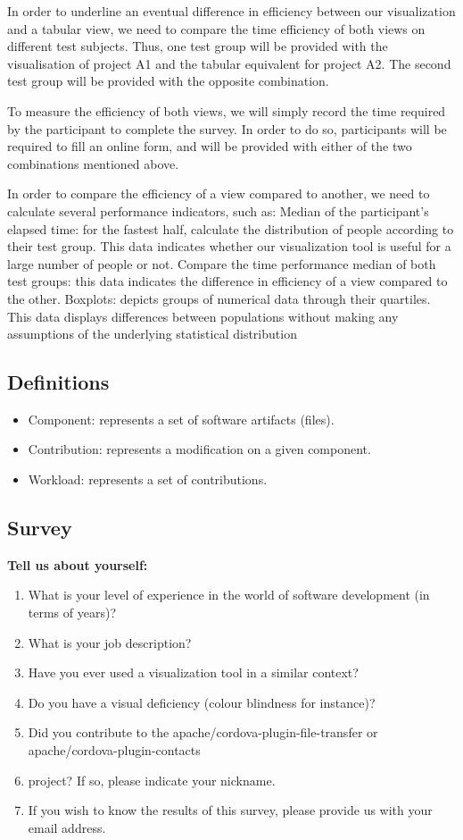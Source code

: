 In order to underline an eventual difference in efficiency between our visualization and a tabular view, we need to compare the time efficiency of both views on different test subjects. Thus, one test group will be provided with the visualisation of project A1 and the tabular equivalent for project A2. The second test group will be provided with the opposite combination.

To measure the efficiency of both views, we will simply record the time required by the participant to complete the survey. In order to do so, participants will be required to fill an online form, and will be provided with either of the two combinations mentioned above.

In order to compare the efficiency of a view compared to another, we need to calculate several performance indicators, such as:
Median of the participant’s elapsed time: for the fastest half, calculate the distribution of people according to their test group. This data indicates whether our visualization tool is useful for a large number of people or not.
Compare the time performance median of both test groups: this data indicates the difference in efficiency of a view compared to the other.
Boxplots: depicts groups of numerical data through their quartiles. This data displays differences between populations without making any assumptions of the underlying statistical distribution


\subsection{Definitions}
\begin{itemize}
\item Component: represents a set of software artifacts (files).
\item Contribution: represents a modification on a given component.
\item Workload: represents a set of contributions.
\end{itemize}

\subsection{Survey}

\textbf{Tell us about yourself:}
\begin{enumerate}
\item What is your level of experience in the world of software development (in terms of years)?
\item What is your job description?
\item Have you ever used a visualization tool in a similar context?
\item Do you have a visual deficiency (colour blindness for instance)?
\item Did you contribute to the apache/cordova-plugin-file-transfer or apache/cordova-plugin-contacts \item project? If so, please indicate your nickname.
\item If you wish to know the results of this survey, please provide us with your email address.
\end{enumerate}

